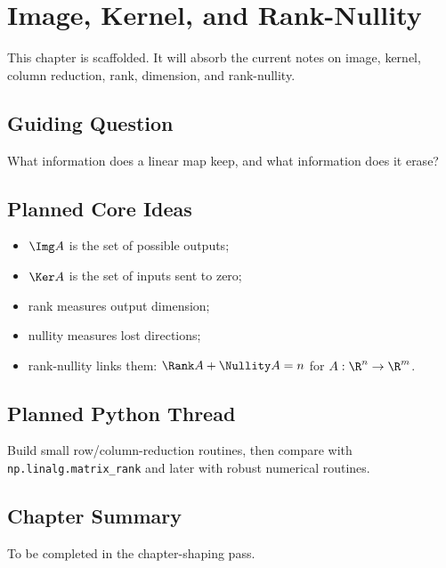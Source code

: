 \chapter{Image, Kernel, and Rank-Nullity}
\label{ch:image-kernel-rank-nullity}

\begin{draftbox}
This chapter is scaffolded. It will absorb the current notes on image, kernel,
column reduction, rank, dimension, and rank-nullity.
\end{draftbox}

\section{Guiding Question}

What information does a linear map keep, and what information does it erase?

\section{Planned Core Ideas}

\begin{itemize}
  \item $\Img A$ is the set of possible outputs;
  \item $\Ker A$ is the set of inputs sent to zero;
  \item rank measures output dimension;
  \item nullity measures lost directions;
  \item rank-nullity links them: $\Rank A+\Nullity A=n$ for
    $A:\R^n\to\R^m$.
\end{itemize}

\section{Planned Python Thread}

Build small row/column-reduction routines, then compare with
\texttt{np.linalg.matrix\_rank} and later with robust numerical routines.

\section*{Chapter Summary}

To be completed in the chapter-shaping pass.


